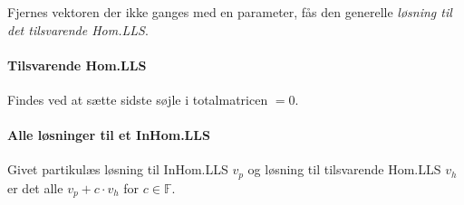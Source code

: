 Fjernes vektoren der ikke ganges med en parameter, fås den generelle \emph{løsning til det tilsvarende Hom.LLS}.


\paragraph{Tilsvarende Hom.LLS}
Findes ved at sætte sidste søjle i totalmatricen $=0$.

\paragraph{Alle løsninger til et InHom.LLS}
Givet partikulæs løsning til InHom.LLS $v_p$ og løsning til tilsvarende Hom.LLS $v_h$ er det alle $v_p + c \cdot v_h$ for $c \in \mathbb{F}$.
